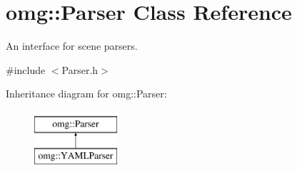 \hypertarget{classomg_1_1_parser}{}\section{omg\+::Parser Class Reference}
\label{classomg_1_1_parser}


An interface for scene parsers.  




{\ttfamily \#include $<$Parser.\+h$>$}

Inheritance diagram for omg\+::Parser\+:\begin{figure}[H]
\begin{center}
\leavevmode
\includegraphics[height=2.000000cm]{classomg_1_1_parser}
\end{center}
\end{figure}
